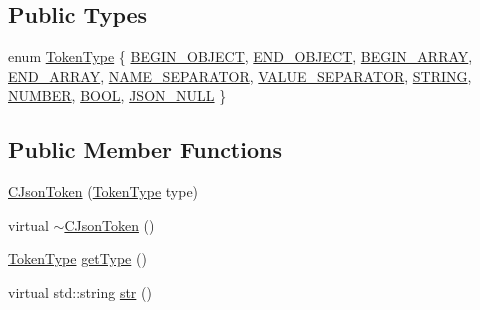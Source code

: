 \subsection*{Public Types}
\begin{DoxyCompactItemize}
\item 
enum \hyperlink{classAPT_1_1CJsonToken_aab8edca6cac7d6c2cd4cb37ea0ab0dce}{Token\+Type} \{ \newline
\hyperlink{classAPT_1_1CJsonToken_aab8edca6cac7d6c2cd4cb37ea0ab0dcea1f2a8e9d11469210748565d9da76292d}{B\+E\+G\+I\+N\+\_\+\+O\+B\+J\+E\+CT}, 
\hyperlink{classAPT_1_1CJsonToken_aab8edca6cac7d6c2cd4cb37ea0ab0dceac9243025ab521a5a32566508563d51f7}{E\+N\+D\+\_\+\+O\+B\+J\+E\+CT}, 
\hyperlink{classAPT_1_1CJsonToken_aab8edca6cac7d6c2cd4cb37ea0ab0dcea6633a9e242838039ada90488b43fd51e}{B\+E\+G\+I\+N\+\_\+\+A\+R\+R\+AY}, 
\hyperlink{classAPT_1_1CJsonToken_aab8edca6cac7d6c2cd4cb37ea0ab0dceaa946046468b4c5948681b0bf26df93ba}{E\+N\+D\+\_\+\+A\+R\+R\+AY}, 
\newline
\hyperlink{classAPT_1_1CJsonToken_aab8edca6cac7d6c2cd4cb37ea0ab0dceae528ae32d2650162babc271e55d01a6f}{N\+A\+M\+E\+\_\+\+S\+E\+P\+A\+R\+A\+T\+OR}, 
\hyperlink{classAPT_1_1CJsonToken_aab8edca6cac7d6c2cd4cb37ea0ab0dcea92e9f88204ae860c01f442a027ef1b6f}{V\+A\+L\+U\+E\+\_\+\+S\+E\+P\+A\+R\+A\+T\+OR}, 
\hyperlink{classAPT_1_1CJsonToken_aab8edca6cac7d6c2cd4cb37ea0ab0dceab38d27c8c3b0aa088ce14682895b19d0}{S\+T\+R\+I\+NG}, 
\hyperlink{classAPT_1_1CJsonToken_aab8edca6cac7d6c2cd4cb37ea0ab0dcea3113bd34020b4bff6e98c04ebc59cf1f}{N\+U\+M\+B\+ER}, 
\newline
\hyperlink{classAPT_1_1CJsonToken_aab8edca6cac7d6c2cd4cb37ea0ab0dceabee35e13f6e1392c313da66ffe95564e}{B\+O\+OL}, 
\hyperlink{classAPT_1_1CJsonToken_aab8edca6cac7d6c2cd4cb37ea0ab0dcea780fac87793f6b528a629e45b89cb895}{J\+S\+O\+N\+\_\+\+N\+U\+LL}
 \}
\end{DoxyCompactItemize}
\subsection*{Public Member Functions}
\begin{DoxyCompactItemize}
\item 
\hyperlink{classAPT_1_1CJsonToken_a02880c73b5e48fa4912297fe304c1265}{C\+Json\+Token} (\hyperlink{classAPT_1_1CJsonToken_aab8edca6cac7d6c2cd4cb37ea0ab0dce}{Token\+Type} type)
\item 
virtual \hyperlink{classAPT_1_1CJsonToken_a89e1a2e9eab654d5be172e7fd9555be1}{$\sim$\+C\+Json\+Token} ()
\item 
\hyperlink{classAPT_1_1CJsonToken_aab8edca6cac7d6c2cd4cb37ea0ab0dce}{Token\+Type} \hyperlink{classAPT_1_1CJsonToken_ab06f02d48757bfc68fb041fcafd680f6}{get\+Type} ()
\item 
virtual std\+::string \hyperlink{classAPT_1_1CJsonToken_a743343b64c20d0aa726d271c2b0e9be8}{str} ()
\end{DoxyCompactItemize}


